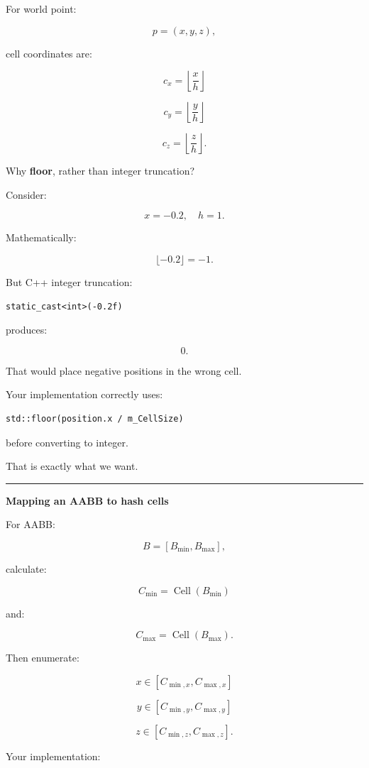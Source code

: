 For world point:

\[
p=(x,y,z),
\]

cell coordinates are:

\[
\boxed{
c_x=\left\lfloor\frac{x}{h}\right\rfloor
}
\]

\[
c_y=\left\lfloor\frac{y}{h}\right\rfloor
\]

\[
c_z=\left\lfloor\frac{z}{h}\right\rfloor.
\]

Why \textbf{floor}, rather than integer truncation?

Consider:

\[
x=-0.2,\quad h=1.
\]

Mathematically:

\[
\lfloor-0.2\rfloor=-1.
\]

But C++ integer truncation:

\begin{verbatim}
static_cast<int>(-0.2f)
\end{verbatim}

produces:

\[
0.
\]

That would place negative positions in the wrong cell.

Your implementation correctly uses:

\begin{verbatim}
std::floor(position.x / m_CellSize)
\end{verbatim}

before converting to integer.

That is exactly what we want.

\begin{center}\rule{0.5\linewidth}{0.5pt}\end{center}

\textbf{Mapping an AABB to hash cells}

For AABB:

\[
B=[B_{\min},B_{\max}],
\]

calculate:

\[
C_{\min}
=
\operatorname{Cell}(B_{\min})
\]

and:

\[
C_{\max}
=
\operatorname{Cell}(B_{\max}).
\]

Then enumerate:

\[
x\in[C_{\min,x},C_{\max,x}]
\]

\[
y\in[C_{\min,y},C_{\max,y}]
\]

\[
z\in[C_{\min,z},C_{\max,z}].
\]

Your implementation:

